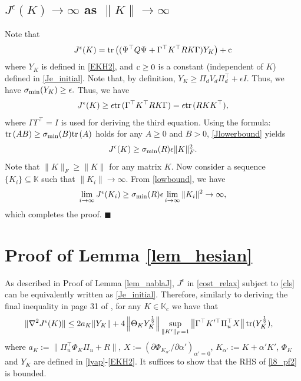 \documentclass[preprint,5p,times,twocolumn]{elsarticle}
\def\tr{{\rm tr} \hspace{0.5mm}}
\def\qed{\hfill $\blacksquare$}
\begin{document}
\subsection{$J^{\epsilon}(K) \to \infty$ as $\|K\| \to \infty$}
Note that  
   \begin{align}
       J^{\epsilon}(K) = {\rm tr}\left(
       (\Psi^{\top}Q\Psi  + \Gamma^{\top}K^{\top}RK\Gamma)Y_K
       \right) + {\rm c}
   \end{align}
   where $Y_K$ is defined in \eqref{EKH2}, and ${\rm c} \geq 0$ is a constant (independent of $K$) defined in \eqref{Je_initial}. Note that, by definition, $Y_K \geq \Pi_d V_d \Pi_d^{\top}+{\epsilon}I$. Thus, we have 
   $
    \sigma_{\rm min}(Y_K) \geq {\epsilon}.     
   $
   Thus, we have
   \begin{align} \label{Jlowerbound}
       J^{\epsilon}(K) \geq {\epsilon} \tr(\Gamma^{\top}K^{\top}RK\Gamma) = {\epsilon} \tr(RKK^{\top}), 
   \end{align}
   where $\Gamma \Gamma^{\top} = I$ is used for deriving the third equation. Using the formula: $\tr(AB) \geq \sigma_{\rm min}(B)\tr(A)$ holds for any $A \geq 0$ and $B > 0$, \eqref{Jlowerbound} yields 
   \begin{align}
       J^{\epsilon}(K) \geq \sigma_{\rm min}(R){\epsilon} \|K\|_F^2. \label{lowbound}
   \end{align}
   Note that $\|K\|_F \geq \|K\|$ for any matrix $K$. Now consider a sequence $\{K_i\} \subseteq \mathbb{K}$ such that $\|K_i\| \to \infty$. From  \eqref{lowbound}, we have 
\[
\lim_{i \to \infty}J^{\epsilon}(K_i) \geq  \sigma_{\rm min}(R)\epsilon \lim_{i \to \infty}\|K_i\|^2 \to \infty,
\]
which completes the proof.
\qed

\section{Proof of Lemma \ref{lem_hesian}} \label{prf_lem_hesian}
As described in Proof of Lemma \ref{lem_nablaJ}, $J^{\epsilon}$ in \eqref{cost_relax} subject to \eqref{cls} can be equivalently written as \eqref{Je_initial}. Therefore, similarly to deriving the final inequality in page 31 of \cite{bu2019lqr}, for any $K \in \mathbb K_c$ we have that
\begin{align}
   \hspace{0mm}\|\nabla^2 J^{\epsilon}(K)\|\leq 2 a_K \|Y_K\| &+ 4 \left\|\Theta_K Y_K^{\frac{1}{2}} \right\| \underset{\|K'\|_F=1}{\sup} \left\|\Gamma^{\top}K'^{\top}\Pi_u^{\top}X\right\| {\rm tr}(Y_K^{\frac{1}{2}}) \label{l8_pf2},
\end{align}
where $a_K := \|\Pi_u^{\top}\Phi_{K}\Pi_u + R \|$,  $X := (\partial \Phi_{K_{\alpha'}} / \partial \alpha')_{\alpha' =0}$, $K_{\alpha'} := K + \alpha'K'$, $\Phi_K$ and $Y_K$ are defined in \eqref{lyap}-\eqref{EKH2}. It suffices to show that the RHS of \eqref{l8_pf2} is bounded. 
\end{document}
